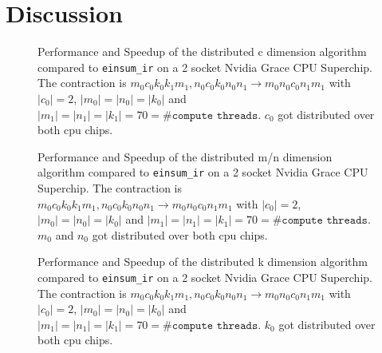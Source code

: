 \section{Discussion}

\begin{figure}
  \caption{
    Performance and Speedup of the distributed c dimension algorithm compared to \texttt{einsum\_ir} on a 2 socket Nvidia Grace CPU Superchip.
    The contraction is $m_0c_0k_0k_1m_1, n_0c_0k_0n_0n_1 \rightarrow m_0n_0c_0n_1m_1$ with $|c_0|=2$, $|m_0|=|n_0|=|k_0|$ and $|m_1|=|n_1|=|k_1|=70=\texttt{\#compute threads}$.
    $c_0$ got distributed over both cpu chips.
    }
  \label{c_perf}
\end{figure}

\begin{figure}
  \caption{
    Performance and Speedup of the distributed m/n dimension algorithm compared to \texttt{einsum\_ir} on a 2 socket Nvidia Grace CPU Superchip.
    The contraction is $m_0c_0k_0k_1m_1, n_0c_0k_0n_0n_1 \rightarrow m_0n_0c_0n_1m_1$ with $|c_0|=2$, $|m_0|=|n_0|=|k_0|$ and $|m_1|=|n_1|=|k_1|=70=\texttt{\#compute threads}$.
    $m_0$ and $n_0$ got distributed over both cpu chips.
    }
  \label{m_n_perf}
\end{figure}

\begin{figure}
  \caption{
    Performance and Speedup of the distributed k dimension algorithm compared to \texttt{einsum\_ir} on a 2 socket Nvidia Grace CPU Superchip.
    The contraction is $m_0c_0k_0k_1m_1, n_0c_0k_0n_0n_1 \rightarrow m_0n_0c_0n_1m_1$ with $|c_0|=2$, $|m_0|=|n_0|=|k_0|$ and $|m_1|=|n_1|=|k_1|=70=\texttt{\#compute threads}$.
    $k_0$ got distributed over both cpu chips.
    }
  \label{k_perf}
\end{figure}